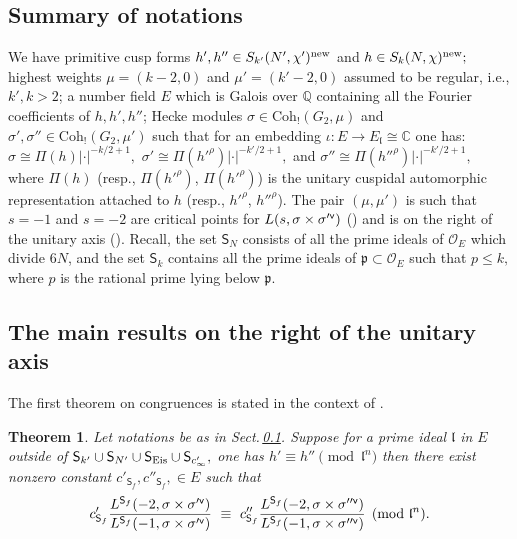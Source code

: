 \documentclass[11pt]{amsart}
\newtheorem{theorem}{Theorem}[section]
\newcommand{\Q}{\mathbb Q}
\newcommand{\C}{\mathbb C}
\newcommand{\sfv}{{\sf v}}
\begin{document}
\medskip
\subsection{Summary of notations} 
\label{sec:notations-summary}
We have primitive cusp forms $h', h'' \in S_{k'}(N',\chi')^{\textup{new}}$ and $h \in S_k(N,\chi)^{\textup{new}};$  
highest weights $\mu = (k-2,0)$ and $\mu' = (k'-2,0)$ assumed to be regular, i.e., $k',k>2$; a number field $E$ which is Galois over $\Q$ containing all the 
Fourier coefficients of $h, h', h''$; 
Hecke modules $\sigma \in \text{Coh}_!(G_2, \mu)$ and $\sigma' , \sigma'' \in \text{Coh}_!(G_2,\mu')$ such that 
for an embedding $\iota : E \to E_\mathfrak{l} \cong \C$ one has: 
$\sigma \cong \Pi(h)|\cdot|^{-k/2+1},$ %
$\sigma' \cong \Pi(h'^\rho)|\cdot|^{-k'/2+1},$ and 
$\sigma'' \cong \Pi(h''^\rho)|\cdot|^{-k'/2+1},$ where 
$\Pi(h)$ (resp., $\Pi(h'^\rho)$, $\Pi(h'^\rho)$) is the unitary cuspidal automorphic representation attached to $h$ (resp., $h'^\rho$, $h''^\rho$).
The pair $(\mu,\mu')$ is such that $s = -1$ and $s = -2$ are critical points for $L(s, \sigma \times \sigma'^\sfv)$ 
(\cite[Lem.\,7.14]{harder-raghuram}) and is on the right of the unitary axis (\cite[Sect.\,6.3.6]{harder-raghuram}).
Recall, the set $\mathsf{S}_N$ consists of all the prime ideals of $\mathcal{O}_E$ which divide $6N$, and the set $\mathsf{S}_{k}$ 
contains all the prime ideals of $ \mathfrak{p} \subset \mathcal{O}_E$ such that $p \leq k,$ where $p$ is the rational prime lying below $\mathfrak{p}.$ 


\medskip
\subsection{The main results on the right of the unitary axis}


The first theorem on congruences is stated in the context of \cite{harder-raghuram}. 

\begin{theorem}
\label{thm: main-theorem-on-the-ratios-of-lvalues-0}
Let notations be as in Sect.\,\ref{sec:notations-summary}. 
Suppose for a prime ideal $\mathfrak{l}$ in $E$ outside of 
$\mathsf{S}_{k'} \cup \mathsf{S}_{N'} \cup \mathsf{S}_{\textup{Eis}} \cup \mathsf{S}_{c'_\infty},$ one has  
$h' \equiv h'' \pmod{\mathfrak{l}^n}$ then there exist nonzero constant $c'_{\mathsf{S}_f}, c''_{\mathsf{S}_f}, \in E$ such that 
\begin{equation}
c'_{\mathsf{S}_f}\frac{L^{\mathsf{S}_f}(-2, \sigma \times \sigma'^\sfv )}{L^{\mathsf{S}_f}(-1, \sigma \times \sigma'^\sfv )} \ \equiv \ 
c''_{\mathsf{S}_f}\frac{L^{\mathsf{S}_f}(-2, \sigma \times \sigma''^\sfv )}{L^{\mathsf{S}_f}(-1, \sigma \times \sigma''^\sfv )}  
\pmod{\mathfrak{l}^n}.
\label{eqn: main-theorem-on-the-ratios-of-lvalues-0}
\end{equation}
\end{theorem}
\end{document}
